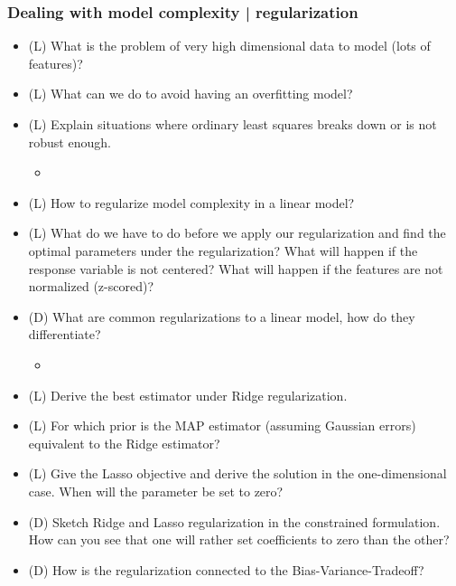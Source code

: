 \subsubsection*{Dealing with model complexity | regularization}
\begin{itemize}
    \item (L) What is the problem of very high dimensional data to model (lots of features)?
    \item (L) What can we do to avoid having an overfitting model?
    \item (L) Explain situations where ordinary least squares breaks down or is not robust enough.
    \begin{itemize}
        \item {}
    \end{itemize}
    \item (L) How to regularize model complexity in a linear model?
    \item (L) What do we have to do before we apply our regularization and find the optimal parameters under the regularization? 
    What will happen if the response variable is not centered? What will happen 
    if the features are not normalized (z-scored)?
    \item (D) What are common regularizations to a linear model, how do they differentiate?
    \begin{itemize}
        \item {}
    \end{itemize}
    \item (L) Derive the best estimator under Ridge regularization.
    \item (L) For which prior is the MAP estimator (assuming Gaussian errors) equivalent to the Ridge estimator?
    \item (L) Give the Lasso objective and derive the solution in the one-dimensional case. When will
    the parameter be set to zero?
    \item (D) Sketch Ridge and Lasso regularization in the constrained formulation. How can you
    see that one will rather set coefficients to zero than the other?
    \item (D) How is the regularization connected to the Bias-Variance-Tradeoff?
\end{itemize}

